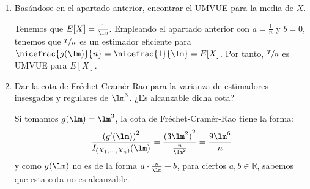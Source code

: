 \begin{ejercicio}
\begin{enumerate}[label=\alph*)]
\begin{equation*}
            \end{equation*}
            Veamos que coincide con la cota de Fréchet-Cramér-Rao, para comprobar nuestro trabajo calculando la familia de estimadores eficientes:
            \begin{equation*}
                \dfrac{{(ag'(\lm))}^{2}}{I_{(X_1,\ldots,X_n)}(\lm)} = \dfrac{{\left(\frac{-an}{\lm^2}\right)}^{2}}{\frac{n}{\lm^2}} = \frac{na^2}{\lm^2} = Var[a\cdot T+b]
            \end{equation*}
        \item Basándose en el apartado anterior, encontrar el UMVUE para la media de $X$.
        
            Tenemos que $E[X] = \frac{1}{\lm}$. Empleando el apartado anterior con $a=\frac{1}{n}$ y $b=0$, tenemos que $\nicefrac{T}{n}$ es un estimador eficiente para $\nicefrac{g(\lm)}{n} = \nicefrac{1}{\lm} = E[X]$. Por tanto, $\nicefrac{T}{n}$ es UMVUE para $E[X]$.

        \item Dar la cota de Fréchet-Cramér-Rao para la varianza de estimadores insesgados y regulares de $\lm^3$. ¿Es alcanzable dicha cota?

            Si tomamos $g(\lm) = \lm^3$, la cota de Fréchet-Cramér-Rao tiene la forma:
            \begin{equation*}
                \frac{{(g'(\lm))}^{2}}{I_{(X_1,\ldots,X_n)}(\lm)} = \frac{{(3\lm^2)}^{2}}{\frac{n}{\lm^2}} = \dfrac{9\lm^6}{n}
            \end{equation*}
            y como $g(\lm)$ no es de la forma $a\cdot \frac{n}{\lm}+b$, para ciertos $a,b\in \mathbb{R}$, sabemos que esta cota no es alcanzable.
    \end{enumerate}
\end{ejercicio}

